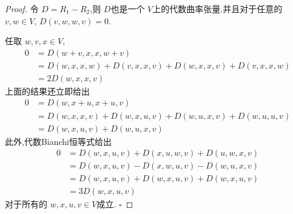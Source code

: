 \documentclass[../../几何与拓扑.tex]{subfiles}
\begin{document}
\begin{proof}
    令 \(  D =  R_1-R_2  \),则 \(  D  \)也是一个  \(  V  \)上的代数曲率张量.并且对于任意的 \(  v,w \in V  \), \(  D\left( v,w,w,v \right)= 0   \).
    
    任取 \(  w,v,x \in V  \),  \[
    \begin{aligned}
    0&=  D\left( w+ v,x,x,w+ v \right)\\ 
     &= D\left( w,x,x,w \right)+ D\left( v,x,x,v \right)+ D\left( w,x,x,v \right)+ D\left( v,x,x,w \right)\\ 
      &= 2D\left( w,x,x,v \right)       
    \end{aligned}
    \]上面的结果还立即给出 \[
    \begin{aligned}
    0&= D\left( w,x+ u,x+ u,v \right)\\ 
     &= D\left( w,x,x,v \right)+ D\left( w,x,u,v \right)+ D\left( w,u,x,v \right)+ D\left( w,u,u,v \right)\\ 
      &= D\left( w,x,u,v \right)+ D\left( w,u,x,v \right)        
    \end{aligned}
    \]此外,代数Bianchi恒等式给出 \[
    \begin{aligned}
    0&= D\left( w,x,u,v \right)+ D\left( x,u,w,v \right)+ D\left( u,w,x,v \right)   \\ 
     &= D\left( w,x,u,v \right)-D\left( x,w,u,v \right)-D\left( w,u,x,v \right) \\ 
      &= D\left( w,x,u,v \right)+ D\left( w,x,u,v \right)   + D\left( w,x,u,v \right)\\ 
       &= 3D\left( w,x,u,v \right)     
    \end{aligned}
    \]
对于所有的 \(  w,x,u,v \in V  \)成立. 
    \hfill $\square$
\end{proof}
\end{document}
